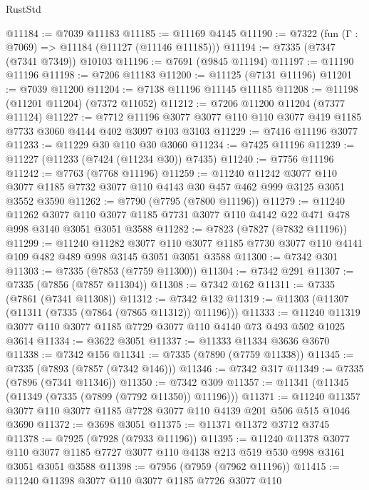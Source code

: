 \begin{lexlean}{RustStd}
\begin{coremodule}
{\begin{coremodule}
{{{{{{{{{{{{{{{{{{{{{{{{{{{{{{{{@11184 := @7039 @11183
@11185 := @11169 @4145
@11190 := @7322 (fun (Γ : @7069) => @11184 (@11127 (@11146 @11185)))
@11194 := @7335 (@7347 (@7341 @7349)) @10103
@11196 := @7691 (@9845 @11194)
@11197 := @11190 @11196
@11198 := @7206 @11183
@11200 := @11125 (@7131 @11196)
@11201 := @7039 @11200
@11204 := @7138 @11196 @11145 @11185
@11208 := @11198 (@11201 @11204) (@7372 @11052)
@11212 := @7206 @11200 @11204 (@7377 @11124)
@11227 := @7712
    @11196
    @3077
    @3077
    @110
    @110
    @3077
    @419
    @1185
    @7733
    @3060
    @4144
    @402
    @3097
    @103
    @3103
@11229 := @7416 @11196 @3077
@11233 := @11229 @30 @110 @30 @3060
@11234 := @7425 @11196
@11239 := @11227 (@11233 (@7424 (@11234 @30)) @7435)
@11240 := @7756 @11196
@11242 := @7763 (@7768 @11196)
@11259 := @11240
    @11242
    @3077
    @110
    @3077
    @1185
    @7732
    @3077
    @110
    @4143
    @30
    @457
    @462
    @999
    @3125
    @3051
    @3552
    @3590
@11262 := @7790 (@7795 (@7800 @11196))
@11279 := @11240
    @11262
    @3077
    @110
    @3077
    @1185
    @7731
    @3077
    @110
    @4142
    @22
    @471
    @478
    @998
    @3140
    @3051
    @3051
    @3588
@11282 := @7823 (@7827 (@7832 @11196))
@11299 := @11240
    @11282
    @3077
    @110
    @3077
    @1185
    @7730
    @3077
    @110
    @4141
    @109
    @482
    @489
    @998
    @3145
    @3051
    @3051
    @3588
@11300 := @7342 @301
@11303 := @7335 (@7853 (@7759 @11300))
@11304 := @7342 @291
@11307 := @7335 (@7856 (@7857 @11304))
@11308 := @7342 @162
@11311 := @7335 (@7861 (@7341 @11308))
@11312 := @7342 @132
@11319 := @11303 (@11307 (@11311 (@7335 (@7864 (@7865 @11312)) @11196)))
@11333 := @11240 @11319 @3077 @110 @3077 @1185 @7729 @3077 @110 @4140 @73 @493 @502 @1025 @3614
@11334 := @3622 @3051
@11337 := @11333 @11334 @3636 @3670
@11338 := @7342 @156
@11341 := @7335 (@7890 (@7759 @11338))
@11345 := @7335 (@7893 (@7857 (@7342 @146)))
@11346 := @7342 @317
@11349 := @7335 (@7896 (@7341 @11346))
@11350 := @7342 @309
@11357 := @11341 (@11345 (@11349 (@7335 (@7899 (@7792 @11350)) @11196)))
@11371 := @11240 @11357 @3077 @110 @3077 @1185 @7728 @3077 @110 @4139 @201 @506 @515 @1046 @3690
@11372 := @3698 @3051
@11375 := @11371 @11372 @3712 @3745
@11378 := @7925 (@7928 (@7933 @11196))
@11395 := @11240
    @11378
    @3077
    @110
    @3077
    @1185
    @7727
    @3077
    @110
    @4138
    @213
    @519
    @530
    @998
    @3161
    @3051
    @3051
    @3588
@11398 := @7956 (@7959 (@7962 @11196))
@11415 := @11240
    @11398
    @3077
    @110
    @3077
    @1185
    @7726
    @3077
    @110
}}}}}}}}}}}}}}}}}}}}}}}}}}}}}}}}
\end{coremodule}}
\end{coremodule}
\end{lexlean}
